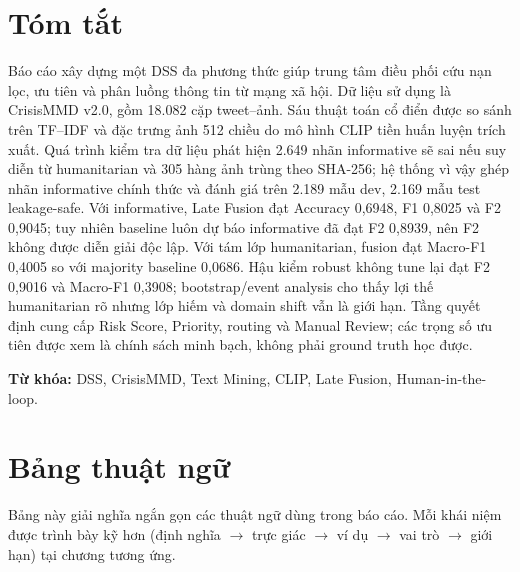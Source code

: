 \chapter*{Tóm tắt}
Báo cáo xây dựng một DSS đa phương thức giúp trung tâm điều phối cứu nạn lọc, ưu tiên và
phân luồng thông tin từ mạng xã hội. Dữ liệu sử dụng là CrisisMMD v2.0, gồm
18.082 cặp tweet--ảnh.
Sáu thuật toán cổ điển được so sánh trên TF--IDF và đặc trưng ảnh 512 chiều do mô hình
CLIP tiền huấn luyện trích xuất. Quá trình kiểm tra dữ liệu phát
hiện 2.649 nhãn informative sẽ sai nếu suy diễn từ humanitarian và 305 hàng ảnh trùng theo
SHA-256; hệ thống vì vậy ghép nhãn informative chính thức và đánh giá trên 2.189 mẫu dev,
2.169 mẫu test leakage-safe. Với informative, Late Fusion đạt Accuracy 0,6948, F1 0,8025
và F2 0,9045; tuy nhiên baseline luôn dự báo informative đã đạt F2 0,8939, nên F2 không
được diễn giải độc lập. Với tám lớp humanitarian, fusion đạt Macro-F1 0,4005 so với
majority baseline 0,0686. Hậu kiểm robust không tune lại đạt F2 0,9016 và Macro-F1
0,3908; bootstrap/event analysis cho thấy lợi thế humanitarian rõ nhưng lớp hiếm và
domain shift vẫn là giới hạn. Tầng quyết định cung cấp Risk Score, Priority, routing và Manual
Review; các trọng số ưu tiên được xem là chính sách minh bạch, không phải ground truth học
được.

\vspace{6pt}
\noindent\textbf{Từ khóa:} DSS, CrisisMMD, Text Mining, CLIP, Late Fusion,
Human-in-the-loop.

\chapter*{Bảng thuật ngữ}
Bảng này giải nghĩa ngắn gọn các thuật ngữ dùng trong báo cáo. Mỗi khái niệm
được trình bày kỹ hơn (định nghĩa $\rightarrow$ trực giác $\rightarrow$ ví dụ
$\rightarrow$ vai trò $\rightarrow$ giới hạn) tại chương tương ứng.

